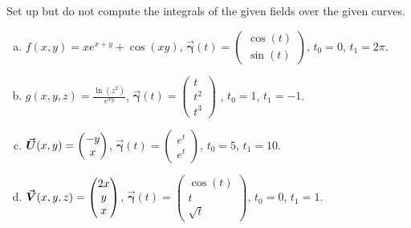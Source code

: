 \documentclass[12pt]{article} %
\newcommand{\curvegamma}{\boldsymbol{\vec{\gamma}}}
\begin{document}
\newpage
\begin{problem}
    Set up but do not compute the integrals of the given fields over the given curves.
    \begin{enumerate}[(a)]
        \item $f(x,y) = xe^{x+y}+\cos(xy)$, $\curvegamma(t) = \begin{pmatrix} \cos(t) \\ \sin(t) \end{pmatrix}$, $t_0 = 0$, $t_1=2\pi$.
        \item $g(x,y,z) = \frac{\ln(z^2)}{e^{xy}}$, $\curvegamma(t) = \begin{pmatrix} t \\ t^2 \\ t^3 \end{pmatrix}$ , $t_0 = 1$, $t_1=-1$.
        \item $\boldsymbol{\vec{U}}(x,y) = \begin{pmatrix} -y \\ x \end{pmatrix}$, $\curvegamma(t) = \begin{pmatrix} e^t \\ e^t \end{pmatrix}$, $t_0 = 5$, $t_1=10$.
        \item $\boldsymbol{\vec{V}}(x,y,z) = \begin{pmatrix} 2x \\ y \\ x \end{pmatrix}$, $\curvegamma(t) = \begin{pmatrix} \cos(t) \\ t \\ \sqrt{t} \end{pmatrix}$, $t_0 = 0$, $t_1=1$.
    \end{enumerate}
\end{problem}
\end{document}
